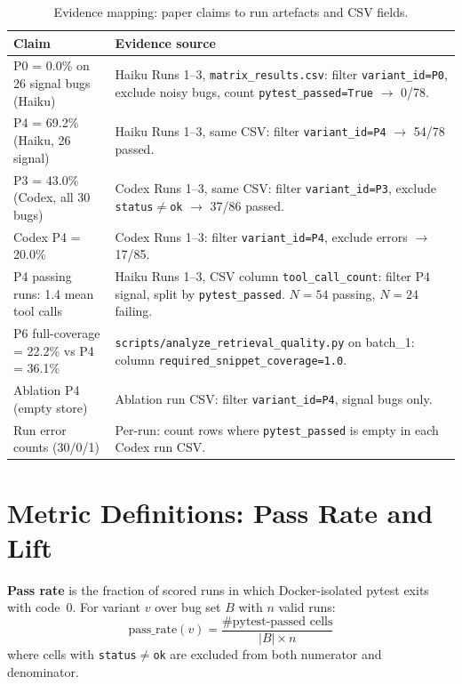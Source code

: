 \documentclass[10pt,a4paper,twocolumn]{article}
\begin{document}
\begin{table}[t]
\centering
\caption{Evidence mapping: paper claims to run artefacts and CSV fields.}
\label{tab:evidence}
\footnotesize
\begin{tabular}{@{}p{4cm}p{5.5cm}@{}}
\toprule
\textbf{Claim} & \textbf{Evidence source} \\
\midrule
P0 = 0.0\% on 26 signal bugs (Haiku) &
    Haiku Runs 1--3, \texttt{matrix\_results.csv}: filter \texttt{variant\_id=P0}, exclude noisy bugs, count \texttt{pytest\_passed=True} $\to$ 0/78. \\
P4 = 69.2\% (Haiku, 26 signal) &
    Haiku Runs 1--3, same CSV: filter \texttt{variant\_id=P4} $\to$ 54/78 passed. \\
P3 = 43.0\% (Codex, all 30 bugs) &
    Codex Runs 1--3, same CSV: filter \texttt{variant\_id=P3}, exclude \texttt{status$\neq$ok} $\to$ 37/86 passed. \\
Codex P4 = 20.0\% &
    Codex Runs 1--3: filter \texttt{variant\_id=P4}, exclude errors $\to$ 17/85. \\
P4 passing runs: 1.4 mean tool calls &
    Haiku Runs 1--3, CSV column \texttt{tool\_call\_count}: filter P4 signal, split by \texttt{pytest\_passed}. $N{=}54$ passing, $N{=}24$ failing. \\
P6 full-coverage = 22.2\% vs P4 = 36.1\% &
    \texttt{scripts/analyze\_retrieval\_quality.py} on batch\_1: column \texttt{required\_snippet\_coverage=1.0}. \\
Ablation P4 (empty store) &
    Ablation run CSV: filter \texttt{variant\_id=P4}, signal bugs only. \\
Run error counts (30/0/1) &
    Per-run: count rows where \texttt{pytest\_passed} is empty in each Codex run CSV. \\
\bottomrule
\end{tabular}
\end{table}

\section{Metric Definitions: Pass Rate and Lift}
\label{app:metrics}

\textbf{Pass rate} is the fraction of scored runs in which Docker-isolated pytest exits with code~0.
For variant $v$ over bug set $B$ with $n$ valid runs:
\[
  \text{pass\_rate}(v) = \frac{\text{\# pytest-passed cells}}{\lvert B \rvert \times n}
\]
where cells with \texttt{status$\neq$ok} are excluded from both numerator and denominator.
\end{document}
